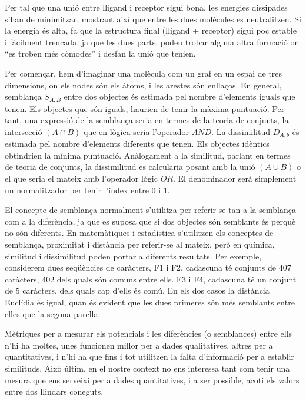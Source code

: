 Per tal que una unió entre lligand i receptor sigui bona, les energies
dissipades s'han de minimitzar, mostrant així que entre les dues molècules es
neutralitzen.  Si la energia és alta, fa que la estructura final (lligand +
receptor) sigui poc estable i fàcilment trencada, ja que les dues parts, poden
trobar alguna altra formació on ``es troben més còmodes'' i desfan la unió que
tenien.


Per començar, hem d'imaginar una molècula com un graf en un espai de tres
dimensions, on els nodes són els àtoms, i les arestes són enllaços.  En general,
semblança $S_{A,B}$ entre dos objectes és estimada pel nombre d'elements iguals
que tenen. Els objectes que són iguals, haurien de tenir la màxima puntuació.
Per tant, una expressió de la semblança seria en termes de la teoria de
conjunts, la intersecció $(A\cap B)$ que en lògica seria l'operador $AND$. La
dissimilitud $D_{A,b}$ és estimada pel nombre d'elements diferents que tenen.
Els objectes idèntics obtindrien la mínima puntuació. Anàlogament a la
similitud, parlant en termes de teoria de conjunts, la dissimilitud es
calcularia posant amb la unió $(A\cup B)$ o el que seria el mateix amb
l'operador lògic $OR$. El denominador serà simplement un normalitzador per tenir
l'índex entre 0 i 1. 

El concepte de semblança normalment s'utilitza per referir-se tan a la semblança
com a la diferència, ja que es suposa que si dos objectes són semblants és
perquè no són diferents. En matemàtiques i estadística s'utilitzen els conceptes
de semblança, proximitat i distància per referir-se al mateix, però en química,
similitud i dissimilitud poden portar a diferents resultats. Per exemple,
considerem dues seqüències de caràcters, F1 i F2, cadascuna té conjunts de 407
caràcters, 402 dels quals són comuns entre ells. F3 i F4, cadascuna té un
conjunt de 5 caràcters, dels quals cap d'ells és comú. En els dos casos la
distància Euclídia és igual, quan és evident que les dues primeres són més
semblants entre elles que la segona parella.

Mètriques per a mesurar els potencials i les diferències (o semblances) entre
ells n'hi ha moltes, unes funcionen millor per a dades qualitatives, altres per
a quantitatives, i n'hi ha que fins i tot utilitzen la falta d'informació per a
establir similituds.  Això últim, en el nostre context no ens interessa tant com
tenir una mesura que ens serveixi per a dades quantitatives, i a ser possible,
acoti els valors entre dos llindars coneguts.

